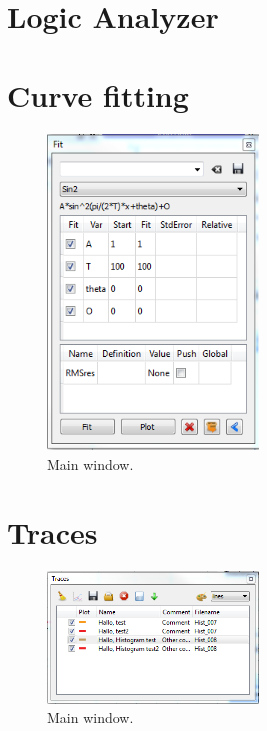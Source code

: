 \documentclass[11pt]{scrartcl}
\begin{document}
\section{Logic Analyzer}

\section{Curve fitting}
\begin{figure}[htbp]
\begin{center}
\includegraphics[width=0.5\textwidth]{CurveFitting}
\end{center}
\caption{\label{AutoloadSettings} Main window.}
\end{figure}

\section{Traces}
\begin{figure}[htbp]
\begin{center}
\includegraphics[width=0.5\textwidth]{Traces}
\end{center}
\caption{\label{AutoloadSettings} Main window.}
\end{figure}
\end{document}
